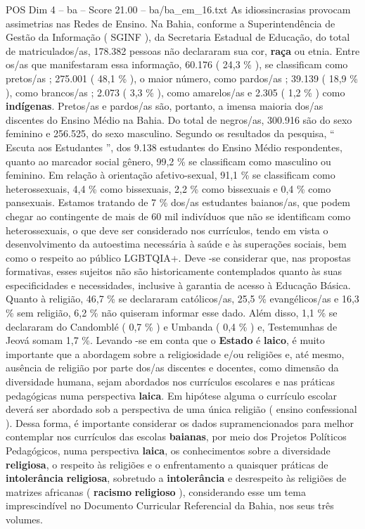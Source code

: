 \begin{textsample}{POS Dim 4 – ba – Score 21.00 – ba/ba\_em\_16.txt}
As idiossincrasias provocam assimetrias nas Redes de Ensino.
Na Bahia, conforme a Superintendência de Gestão da Informação ( SGINF ), da Secretaria Estadual de Educação, do total de matriculados/as, 178.382 pessoas não declararam sua cor, \textbf{raça} ou etnia.
Entre os/as que manifestaram essa informação, 60.176 ( 24,3 \% ), se classificam como pretos/as ; 275.001 ( 48,1 \% ), o maior número, como pardos/as ; 39.139 ( 18,9 \% ), como brancos/as ; 2.073 ( 3,3 \% ), como amarelos/as e 2.305 ( 1,2 \% ) como \textbf{indígenas}.
Pretos/as e pardos/as são, portanto, a imensa maioria dos/as discentes do Ensino Médio na Bahia.
Do total de negros/as, 300.916 são do sexo feminino e 256.525, do sexo masculino.
Segundo os resultados da pesquisa, “ Escuta aos Estudantes ”, dos 9.138 estudantes do Ensino Médio respondentes, quanto ao marcador social gênero, 99,2 \% se classificam como masculino ou feminino.
Em relação à orientação afetivo-sexual, 91,1 \% se classificam como heterossexuais, 4,4 \% como bissexuais, 2,2 \% como bissexuais e 0,4 \% como pansexuais.
Estamos tratando de 7 \% dos/as estudantes baianos/as, que podem chegar ao contingente de mais de 60 mil indivíduos que não se identificam como heterossexuais, o que deve ser considerado nos currículos, tendo em vista o desenvolvimento da autoestima necessária à saúde e às superações sociais, bem como o respeito ao público LGBTQIA+.
Deve -se considerar que, nas propostas formativas, esses sujeitos não são historicamente contemplados quanto às suas especificidades e necessidades, inclusive à garantia de acesso à Educação Básica.
Quanto à religião, 46,7 \% se declararam católicos/as, 25,5 \% evangélicos/as e 16,3 \% sem religião, 6,2 \% não quiseram informar esse dado.
Além disso, 1,1 \% se declararam do Candomblé ( 0,7 \% ) e Umbanda ( 0,4 \% ) e, Testemunhas de Jeová somam 1,7 \%.
Levando -se em conta que o \textbf{Estado} é \textbf{laico}, é muito importante que a abordagem sobre a religiosidade e/ou religiões e, até mesmo, ausência de religião por parte dos/as discentes e docentes, como dimensão da diversidade humana, sejam abordados nos currículos escolares e nas práticas pedagógicas numa perspectiva \textbf{laica}.
Em hipótese alguma o currículo escolar deverá ser abordado sob a perspectiva de uma única religião ( ensino confessional ).
Dessa forma, é importante considerar os dados supramencionados para melhor contemplar nos currículos das escolas \textbf{baianas}, por meio dos Projetos Políticos Pedagógicos, numa perspectiva \textbf{laica}, os conhecimentos sobre a diversidade \textbf{religiosa}, o respeito às religiões e o enfrentamento a quaisquer práticas de \textbf{intolerância} \textbf{religiosa}, sobretudo a \textbf{intolerância} e desrespeito às religiões de matrizes africanas ( \textbf{racismo} \textbf{religioso} ), considerando esse um tema imprescindível no Documento Curricular Referencial da Bahia, nos seus três volumes.

\end{textsample}

